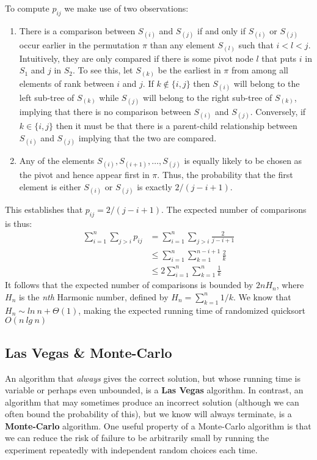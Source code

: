 To compute $p_{ij}$ we make use of two observations:
%
\begin{enumerate}
	\item There is a comparison between $S_{(i)}$ and $S_{(j)}$ if and only if $S_{(i)}$ or $S_{(j)}$ occur
	earlier in the permutation $\pi$ than any element $S_{(l)}$ such that $i < l < j$. Intuitively, they are
	only compared if there is some pivot node $l$ that puts $i$ in $S_1$ and $j$ in $S_2$. To see this, let
	$S_{(k)}$ be the earliest in $\pi$ from among all elements of rank between $i$ and $j$. If $k \notin \{i,j\}$
	then $S_{(i)}$ will belong to the left sub-tree of $S_{(k)}$ while $S_{(j)}$ will belong to the right sub-tree
	of $S_{(k)}$, implying that there is no comparison between $S_{(i)}$ and $S_{(j)}$. Conversely, if
	$k \in \{i,j\}$ then it must be that there is a parent-child relationship between $S_{(i)}$ and $S_{(j)}$
	implying that the two are compared.

	\item Any of the elements $S_{(i)}, S_{(i+1)}, \hdots, S_{(j)}$ is equally likely to be chosen as the pivot and
	hence appear first in $\pi$. Thus, the probability that the first element is either $S_{(i)}$ or $S_{(j)}$ is
	exactly $2 / (j - i + 1)$.
\end{enumerate}
%
This establishes that $p_{ij} = 2/(j - i + 1)$. The expected number of comparisons is thus:
%
\begin{align*}
	\sum_{i=1}^n \sum_{j>i} p_{ij} &= \sum_{i=1}^n \sum_{j>i} \frac{2}{j-i+1} \\
	&\leq \sum_{i=1}^n \sum_{k=1}^{n-i+1} \frac{2}{k} \\
	&\leq 2\sum_{i=1}^n \sum_{k=1}^{n} \frac{1}{k}
\end{align*}
%
It follows that the expected number of comparisons is bounded by $2nH_n$, where $H_n$ is the \textit{nth}
Harmonic number, defined by $H_n = \sum_{k=1}^n 1/k$. We know that $H_n \sim ln\ n + \Theta(1)$, making the
expected running time of randomized quicksort $O(n\ lg\ n)$

\subsection{Las Vegas \& Monte-Carlo}
An algorithm that \textit{always} gives the correct solution, but whose running time is variable or perhaps even
unbounded, is a \textbf{Las Vegas} algorithm. In contrast, an algorithm that may sometimes produce an incorrect
solution (although we can often bound the probability of this), but we know will always terminate, is a
\textbf{Monte-Carlo} algorithm. One useful property of a Monte-Carlo algorithm is that we can reduce the risk of
failure to be arbitrarily small by running the experiment repeatedly with
independent random choices each time.

